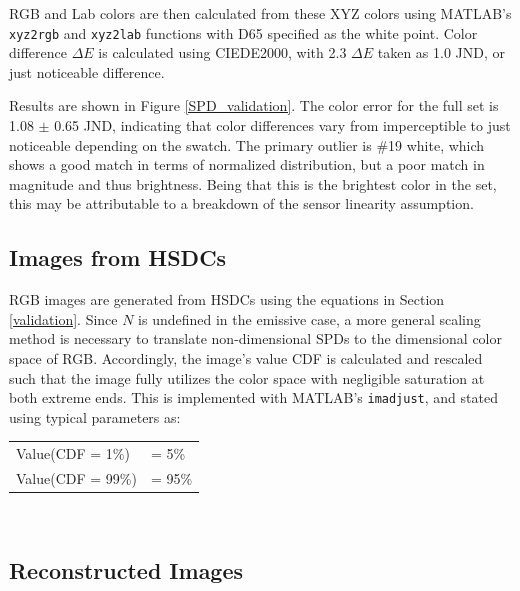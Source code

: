 \documentclass[twocolumn,10pt]{asme2ej}
\newcommand{\id}{\hspace{6 mm}}
\begin{document}
RGB and Lab colors are then calculated from these XYZ colors using MATLAB's \texttt{xyz2rgb} and \texttt{xyz2lab} functions with D65 specified as the white point. Color difference $\Delta E$ is calculated using CIEDE2000, with 2.3 $\Delta E$ taken as 1.0 JND, or just noticeable difference. \cite{Sharma}

\id Results are shown in Figure \ref{SPD_validation}. The color error for the full set is 1.08 $\pm$ 0.65 JND, indicating that color differences vary from imperceptible to just noticeable depending on the swatch. The primary outlier is \#19 white, which shows a good match in terms of normalized distribution, but a poor match in magnitude and thus brightness. Being that this is the brightest color in the set, this may be attributable to a breakdown of the sensor linearity assumption.

\subsection{Images from HSDCs}

RGB images are generated from HSDCs using the equations in Section \ref{validation}. Since $N$ is undefined in the emissive case, a more general scaling method is necessary to translate non-dimensional SPDs to the dimensional color space of RGB. Accordingly, the image's value CDF is calculated and rescaled such that the image fully utilizes the color space with negligible saturation at both extreme ends. This is implemented with MATLAB's \texttt{imadjust}, and stated using typical parameters as:\\

\begin{tabular}{l l}
Value(CDF = 1\%) & = 5\%\\
Value(CDF = 99\%) & = 95\%\\
\end{tabular}\\

\clearpage

\onecolumn

\subsection{Reconstructed Images}
\end{document}

